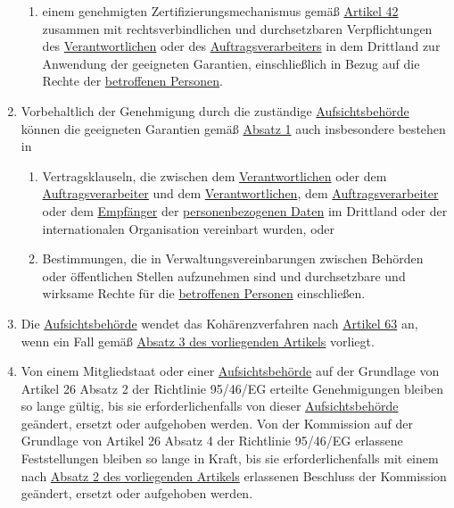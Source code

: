 \begin{enumerate}
\begin{enumerate}
    \item einem genehmigten Zertifizierungsmechanismus gemäß \hyperref[ch:42]{Artikel 42} zusammen mit
     rechtsverbindlichen und durchsetzbaren Verpflichtungen des \hyperref[itm:04-7]{Verantwortlichen} oder
     des \hyperref[itm:04-8]{Auftragsverarbeiters} in dem Drittland zur Anwendung der geeigneten Garantien,
     einschließlich in Bezug auf die Rechte der \hyperref[itm:04-1]{betroffenen Personen}.%
    \label{itm:46-2f}

  \end{enumerate}

  \item Vorbehaltlich der Genehmigung durch die zuständige \hyperref[itm:04-21]{Aufsichtsbehörde} können die geeigneten
   Garantien gemäß
   \hyperref[itm:46-1]{Absatz 1} auch insbesondere bestehen in%
  \label{itm:46-3}

  \begin{enumerate}
  
    \item Vertragsklauseln, die zwischen dem \hyperref[itm:04-7]{Verantwortlichen} oder dem \hyperref[itm:04-8]
     {Auftragsverarbeiter} und dem \hyperref[itm:04-7]{Verantwortlichen}, dem
     \hyperref[itm:04-8]{Auftragsverarbeiter} oder dem \hyperref[itm:04-9]{Empfänger} der \hyperref[itm:04-1]
      {personenbezogenen Daten} im Drittland oder der internationalen Organisation vereinbart wurden, oder%
    \label{itm:46-3a}

    \item Bestimmungen, die in Verwaltungsvereinbarungen zwischen Behörden oder öffentlichen Stellen aufzunehmen sind
     und durchsetzbare und wirksame Rechte für die \hyperref[itm:04-1]{betroffenen Personen} einschließen.%
    \label{itm:46-3b}

  \end{enumerate}

  \item Die \hyperref[itm:04-21]{Aufsichtsbehörde} wendet das Kohärenzverfahren nach \hyperref[ch:63]{Artikel 63} an,
   wenn ein Fall gemäß
   \hyperref[itm:46-3]{Absatz 3 des vorliegenden Artikels} vorliegt.%
  \label{itm:46-4}

  \item Von einem Mitgliedstaat oder einer \hyperref[itm:04-21]{Aufsichtsbehörde} auf der Grundlage von Artikel 26
   Absatz 2 der Richtlinie 95/46/EG erteilte Genehmigungen bleiben so
   lange gültig, bis sie erforderlichenfalls von dieser \hyperref[itm:04-21]{Aufsichtsbehörde} geändert, ersetzt oder
   aufgehoben werden. Von der Kommission auf der Grundlage von Artikel 26 Absatz 4 der Richtlinie 95/46/EG erlassene
   Feststellungen bleiben so lange in Kraft, bis sie erforderlichenfalls mit einem nach \hyperref[itm:46-2]{Absatz 2
   des vorliegenden Artikels} erlassenen Beschluss der Kommission geändert, ersetzt oder aufgehoben werden.%
  \label{itm:46-5}

\end{enumerate}


